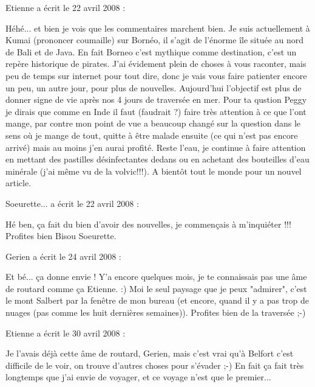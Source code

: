 \medskip
Etienne a écrit le 22 avril 2008 :
\begin{displayquote}
Héhé... et bien je vois que les commentaires marchent bien.
Je suis actuellement à Kumai (prononcer coumaille) sur Bornéo, il s'agit de l'énorme île située au nord de Bali et de Java.
En fait Borneo c'est mythique comme destination, c'est un repère historique de pirates.
J'ai évidement plein de choses à vous raconter, mais peu de temps sur internet pour tout dire, donc je vais vous faire patienter encore un peu, un autre jour, pour plus de nouvelles. Aujourd'hui l'objectif est plus de donner signe de vie après nos 4 jours de traversée en mer.
Pour ta qustion Peggy je dirais que comme en Inde il faut (faudrait ?) faire très attention à ce que l'ont mange, par contre mon point de vue a beaucoup changé sur la question dans le sens où je mange de tout, quitte à être malade ensuite (ce qui n'est pas encore arrivé) mais au moins j'en aurai profité. Reste l'eau, je continue à faire attention en mettant des pastilles désinfectantes dedans ou en achetant des bouteilles d'eau minérale (j'ai même vu de la volvic!!!).
A bientôt tout le monde pour un nouvel article.
\end{displayquote}

\medskip
Soeurette... a écrit le 22 avril 2008 :
\begin{displayquote}
Hé ben, ça fait du bien d'avoir des nouvelles, je commençais à m'inquiéter !!!
Profites bien
Bisou
Soeurette.
\end{displayquote}

\medskip
Gerien a écrit le 24 avril 2008 :
\begin{displayquote}
Et bé... ça donne envie !
Y'a encore quelques mois, je te connaissais pas une âme de routard comme ça Etienne. :)
Moi le seul paysage que je peux "admirer", c'est le mont Salbert par la fenêtre de mon bureau (et encore, quand il y a pas trop de nuages (pas comme les huit dernières semaines)).
Profites bien de la traversée ;-)
\end{displayquote}

\medskip
Etienne a écrit le 30 avril 2008 :
\begin{displayquote}
Je l'avais déjà cette âme de routard, Gerien, mais c'est vrai qu'à Belfort c'est difficile de le voir, on trouve d'autres choses pour s'évader ;-) En fait ça fait très longtemps que j'ai envie de voyager, et ce voyage n'est que le premier...
\end{displayquote}

\vfill
